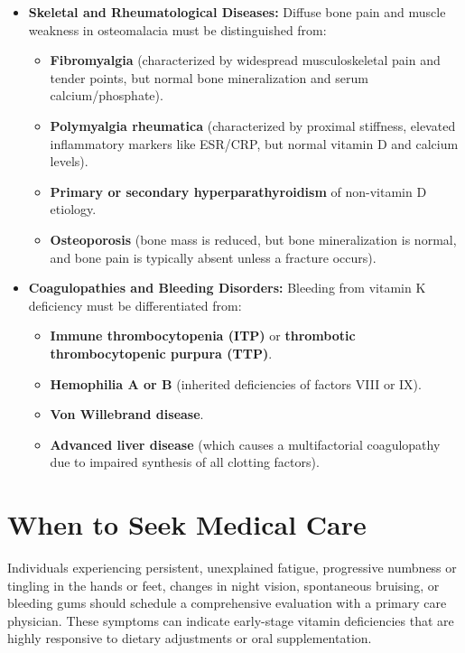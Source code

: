 \begin{itemize}
    \item \textbf{Skeletal and Rheumatological Diseases:} Diffuse bone pain and muscle weakness in osteomalacia must be distinguished from:
    \begin{itemize}
        \item \textbf{Fibromyalgia} (characterized by widespread musculoskeletal pain and tender points, but normal bone mineralization and serum calcium/phosphate).
        \item \textbf{Polymyalgia rheumatica} (characterized by proximal stiffness, elevated inflammatory markers like ESR/CRP, but normal vitamin D and calcium levels).
        \item \textbf{Primary or secondary hyperparathyroidism} of non-vitamin D etiology.
        \item \textbf{Osteoporosis} (bone mass is reduced, but bone mineralization is normal, and bone pain is typically absent unless a fracture occurs).
    \end{itemize}

    \item \textbf{Coagulopathies and Bleeding Disorders:} Bleeding from vitamin K deficiency must be differentiated from:
    \begin{itemize}
        \item \textbf{Immune thrombocytopenia (ITP)} or \textbf{thrombotic thrombocytopenic purpura (TTP)}.
        \item \textbf{Hemophilia A or B} (inherited deficiencies of factors VIII or IX).
        \item \textbf{Von Willebrand disease}.
        \item \textbf{Advanced liver disease} (which causes a multifactorial coagulopathy due to impaired synthesis of all clotting factors).
    \end{itemize}
\end{itemize}

\section*{When to Seek Medical Care}
Individuals experiencing persistent, unexplained fatigue, progressive numbness or tingling in the hands or feet, changes in night vision, spontaneous bruising, or bleeding gums should schedule a comprehensive evaluation with a primary care physician. These symptoms can indicate early-stage vitamin deficiencies that are highly responsive to dietary adjustments or oral supplementation.

